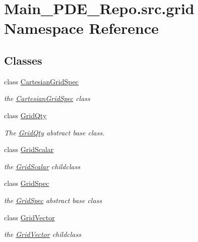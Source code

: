 \hypertarget{namespaceMain__PDE__Repo_1_1src_1_1grid}{}\section{Main\+\_\+\+P\+D\+E\+\_\+\+Repo.\+src.\+grid Namespace Reference}
\label{namespaceMain__PDE__Repo_1_1src_1_1grid}
\subsection*{Classes}
\begin{DoxyCompactItemize}
\item 
class \hyperlink{classMain__PDE__Repo_1_1src_1_1grid_1_1CartesianGridSpec}{Cartesian\+Grid\+Spec}
\begin{DoxyCompactList}\small\item\em the \hyperlink{classMain__PDE__Repo_1_1src_1_1grid_1_1CartesianGridSpec}{Cartesian\+Grid\+Spec} class \end{DoxyCompactList}\item 
class \hyperlink{classMain__PDE__Repo_1_1src_1_1grid_1_1GridQty}{Grid\+Qty}
\begin{DoxyCompactList}\small\item\em The \hyperlink{classMain__PDE__Repo_1_1src_1_1grid_1_1GridQty}{Grid\+Qty} abstract base class. \end{DoxyCompactList}\item 
class \hyperlink{classMain__PDE__Repo_1_1src_1_1grid_1_1GridScalar}{Grid\+Scalar}
\begin{DoxyCompactList}\small\item\em the \hyperlink{classMain__PDE__Repo_1_1src_1_1grid_1_1GridScalar}{Grid\+Scalar} childclass \end{DoxyCompactList}\item 
class \hyperlink{classMain__PDE__Repo_1_1src_1_1grid_1_1GridSpec}{Grid\+Spec}
\begin{DoxyCompactList}\small\item\em the \hyperlink{classMain__PDE__Repo_1_1src_1_1grid_1_1GridSpec}{Grid\+Spec} abstract base class \end{DoxyCompactList}\item 
class \hyperlink{classMain__PDE__Repo_1_1src_1_1grid_1_1GridVector}{Grid\+Vector}
\begin{DoxyCompactList}\small\item\em the \hyperlink{classMain__PDE__Repo_1_1src_1_1grid_1_1GridVector}{Grid\+Vector} childclass \end{DoxyCompactList}\end{DoxyCompactItemize}
